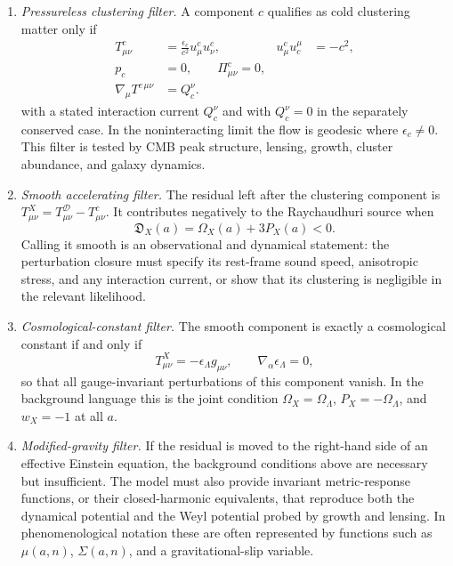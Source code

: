 \documentclass[
  aps,
  prd,
  reprint,
  superscriptaddress,
  nofootinbib,
  floatfix,
  longbibliography
]{revtex4-2}
\theoremstyle{plain}
\theoremstyle{definition}
\theoremstyle{remark}
\newcommand{\D}{\mathcal D}
\newcommand{\Dacc}{\mathfrak D_X}
\begin{document}
\begin{enumerate}
\item \textit{Pressureless clustering filter.}  A component $c$ qualifies as
cold clustering matter only if
\begin{align}
T^c_{\mu\nu}
&=\frac{\epsilon_c}{c^2}u^c_\mu u^c_\nu,
&
u^c_\mu u_c^\mu&=-c^2,
\nonumber\\
p_c&=0,\qquad
\Pi^c_{\mu\nu}=0,
\nonumber\\
\nabla_\mu T^{c\,\mu\nu}&=Q_c^\nu .
\label{eq:dust_filter}
\end{align}
with a stated interaction current $Q_c^\nu$ and with $Q_c^\nu=0$ in the
separately conserved case.  In the noninteracting limit the flow is geodesic
where $\epsilon_c\ne0$.  This filter is tested by CMB peak structure, lensing,
growth, cluster abundance, and galaxy dynamics.

\item \textit{Smooth accelerating filter.}  The residual left after the
clustering component is
$T^X_{\mu\nu}=T^\D_{\mu\nu}-T^c_{\mu\nu}$.  It contributes negatively to the
Raychaudhuri source when
\begin{equation}
\Dacc(a)=\Omega_X(a)+3P_X(a)<0 .
\label{eq:smooth_acceleration_filter}
\end{equation}
Calling it smooth is an observational and dynamical statement: the perturbation
closure must specify its rest-frame sound speed, anisotropic stress, and any
interaction current, or show that its clustering is negligible in the relevant
likelihood.

\item \textit{Cosmological-constant filter.}  The smooth component is exactly a
cosmological constant if and only if
\begin{equation}
T^X_{\mu\nu}=-\epsilon_\Lambda g_{\mu\nu},\qquad
\nabla_\alpha\epsilon_\Lambda=0,
\label{eq:lambda_filter}
\end{equation}
so that all gauge-invariant perturbations of this component vanish.  In the
background language this is the joint condition
$\Omega_X=\Omega_\Lambda$, $P_X=-\Omega_\Lambda$, and $w_X=-1$ at all $a$.

\item \textit{Modified-gravity filter.}  If the residual is moved to the
right-hand side of an effective Einstein equation, the background conditions
above are necessary but insufficient.  The model must also provide invariant
metric-response functions, or their closed-harmonic equivalents, that reproduce
both the dynamical potential and the Weyl potential probed by growth and
lensing.  In phenomenological notation these are often represented by functions
such as $\mu(a,n)$, $\Sigma(a,n)$, and a gravitational-slip variable.
\end{enumerate}
\end{document}
